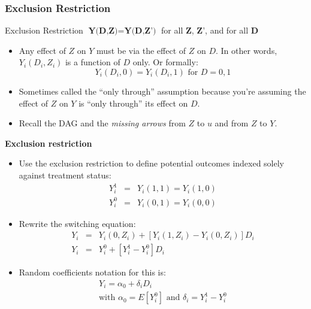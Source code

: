 \documentclass[notes=show]{beamer}
\begin{document}
\begin{frame}[plain]
\frametitle{Exclusion Restriction}

	\begin{block}{Exclusion Restriction}
	$\textbf{Y(D,Z)}=\textbf{Y(D,Z')}$ for all $\textbf{Z}$, $\textbf{Z'}$, and for all $\textbf{D}$
	\end{block}
	
\begin{itemize}
\item Any effect of $Z$ on $Y$ must be via the effect of $Z$ on $D$. In other words, $Y_i(D_i,Z_i)$ is a function of $D$ only.  Or formally:$$Y_i(D_i,0)=Y_i(D_i,1) \text{ for }D=0,1$$
\item Sometimes called the ``only through'' assumption because you're assuming the effect of $Z$ on $Y$ is ``only through'' its effect on $D$.
\item Recall the DAG and the \emph{missing arrows} from $Z$ to $u$ and from $Z$ to $Y$.
\end{itemize}
	
\end{frame}





\begin{frame}[plain]

	\begin{center}
	\textbf{Exclusion restriction}
	\end{center}
	
	\begin{itemize}
	\item Use the exclusion restriction to define potential outcomes indexed solely against treatment status: 
		\begin{eqnarray*}
		 Y^1_{i} &=& Y_i(1,1) = Y_i(1,0) \\
		 Y^0_{i} &=& Y_i(0,1) = Y_i(0,0)
		\end{eqnarray*}
	\item Rewrite the switching equation:
		\begin{eqnarray*}
		Y_i &=& Y_i(0,Z_i) + [Y_i(1,Z_i) - Y_i(0,Z_i)]D_i \\
		Y_i &=& Y^0_{i} + [Y^1_{i} - Y^0_{i}]D_i
		\end{eqnarray*}
	\item Random coefficients notation for this is:
		\begin{align*}
		&Y_i = \alpha_0 + \delta_iD_i& \\
		&\text{with }\alpha_0	= E[Y^0_{i}]\text{ and }\delta_i = Y^1_{i} - Y^0_{i}
		\end{align*}
	\end{itemize}

\end{frame}
\end{document}
